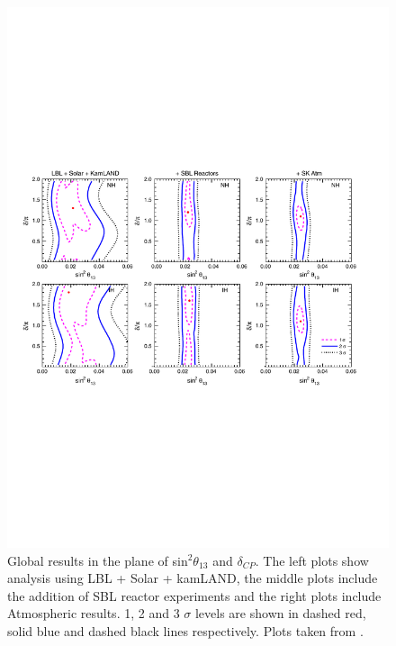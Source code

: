 \vspace{-5mm}
\begin{figure}[htbp]
	\begin{center}
		\includegraphics[width=150mm]{Introduction/IntroductionFigs/globalAnalysisNeutrinoPlots2.pdf}
		\caption{Global results in the plane of sin$^{2}\theta_{13}$ and $\delta_{CP}$. The left plots show analysis using LBL + Solar + kamLAND, the middle plots include the addition of SBL reactor experiments and the right plots include Atmospheric results. 1, 2 and 3 $\sigma$ levels are shown in dashed red, solid blue and dashed black lines respectively. Plots taken from \cite{fogliNeutrinoPlots}.}
		\label{fig:globalNeutrinoPara2}
	\end{center}
\end{figure}


